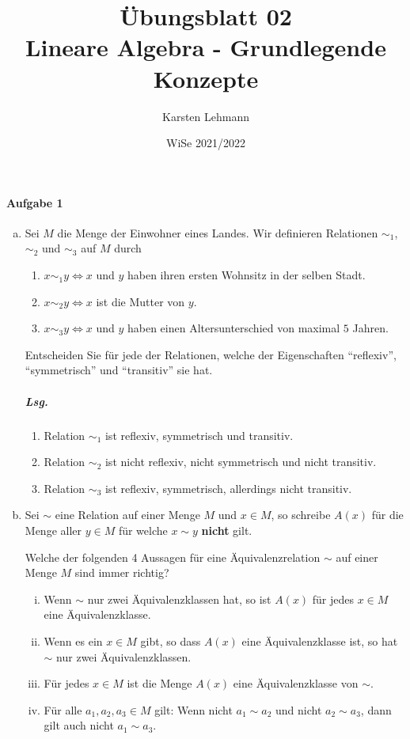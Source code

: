 \documentclass{scrreprt}
\author{Karsten Lehmann}
\date{WiSe 2021/2022}
\title{Übungsblatt 02\\Lineare Algebra - Grundlegende Konzepte}
\begin{document}
\paragraph{Aufgabe 1}
\begin{enumerate}[(a)]
\item Sei $M$ die Menge der Einwohner eines Landes.
  Wir definieren Relationen $\sim_1$, $\sim_2$ und $\sim_3$ auf $M$ durch
  \begin{enumerate}[1)]
  \item $x \sim_1 y \iff x$ und $y$ haben ihren ersten Wohnsitz in der selben
    Stadt.

  \item $x \sim_2 y \iff x$ ist die Mutter von $y$.
  \item $x \sim_3 y \iff x$ und $y$ haben einen Altersunterschied von maximal
    $5$ Jahren.
  \end{enumerate}
  Entscheiden Sie für jede der Relationen, welche der Eigenschaften ``reflexiv'',
  ``symmetrisch'' und ``transitiv'' sie hat.

  \subparagraph{Lsg.}
  \begin{enumerate}[1)]
  \item Relation $\sim_1$ ist reflexiv, symmetrisch und transitiv.
  \item Relation $\sim_2$ ist nicht reflexiv, nicht symmetrisch und nicht
    transitiv.

  \item Relation $\sim_3$ ist reflexiv, symmetrisch, allerdings nicht transitiv.
  \end{enumerate}

\item Sei $\sim$ eine Relation auf einer Menge $M$ und $x \in M$, so schreibe
  $A(x)$ für die Menge aller $y \in M$ für welche $x \sim y$ \textbf{nicht} gilt.

  Welche der folgenden 4 Aussagen für eine Äquivalenzrelation $\sim$ auf einer
  Menge $M$ sind immer richtig?
  \begin{enumerate}[(i)]
  \item Wenn $\sim$ nur zwei Äquivalenzklassen hat, so ist $A(x)$ für jedes
    $x \in M$ eine Äquivalenzklasse.

  \item Wenn es ein $x \in M$ gibt, so dass $A(x)$ eine Äquivalenzklasse ist,
    so hat $\sim$ nur zwei Äquivalenzklassen.

  \item Für jedes $x \in M$ ist die Menge $A(x)$ eine Äquivalenzklasse von $\sim$.
  \item Für alle $a_1, a_2, a_3 \in M$ gilt: Wenn nicht $a_1 \sim a_2$ und nicht
    $a_2 \sim a_3$, dann gilt auch nicht $a_1 \sim a_3$.
  \end{enumerate}


\end{enumerate}
\end{document}
